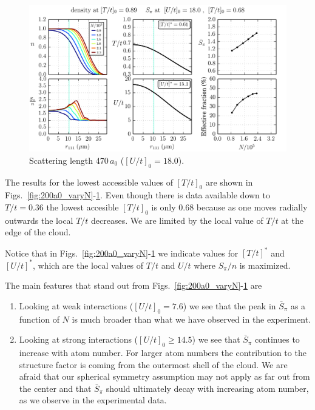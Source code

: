 \documentclass[11pt,letter]{article}
\begin{document}
\begin{figure}
    \centering
\includegraphics[width=\textwidth]{figures/470a0_cold.png}
\caption{Scattering length 470\,$a_{0}$ ($[U/t]_{0}=18.0$).   } 
\label{fig:470a0_varyN}
\end{figure}

The results for the lowest accessible values of $[T/t]_{0}$ are shown in
Figs.~\ref{fig:200a0_varyN}-\ref{fig:470a0_varyN}.   Even though there is data
available down to $T/t=0.36$ the lowest accesible $[T/t]_{0}$ is only 0.68
because as one moves radially outwards the local $T/t$ decreases.  We are
limited by the local value of $T/t$ at the edge of the cloud.   

Notice that in Figs.~\ref{fig:200a0_varyN}-\ref{fig:470a0_varyN} we indicate
values for $[T/t]^{*}$ and $[U/t]^{*}$, which are the local values of $T/t$ and
$U/t$ where $S_{\pi}/n$ is maximized.     

The main features that stand out from
Figs.~\ref{fig:200a0_varyN}-\ref{fig:470a0_varyN} are 
\begin{enumerate}

  \item Looking at weak interactions ($[U/t]_{0}=7.6$) we see that the peak in
$\bar{S}_{\pi}$  as a function of $N$ is much broader than what we have
observed in the experiment. 
 
  \item Looking at strong interactions ($[U/t]_{0}\geq 14.5$) we see that
$\bar{S}_{\pi}$ continues to increase with atom number.  For larger atom
numbers the contribution to the structure factor is coming from the outermost
shell of the cloud.   We are afraid that our spherical symmetry assumption may
not apply as far out from the center and that $\bar{S}_{\pi}$ should ultimately
decay with increasing atom number, as we observe in the experimental data.
\end{enumerate}
\end{document}
